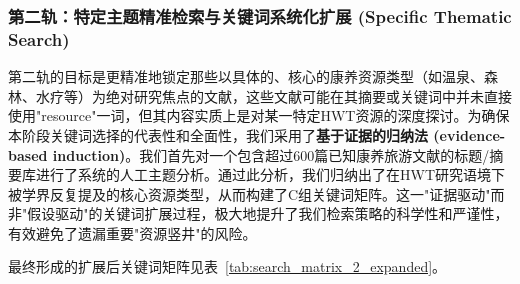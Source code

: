 \documentclass[UTF8, 12pt, a4paper, twoside]{ctexart}
\begin{document}
\subsubsection{第二轨：特定主题精准检索与关键词系统化扩展 (Specific Thematic Search)}
第二轨的目标是更精准地锁定那些以具体的、核心的康养资源类型（如温泉、森林、水疗等）为绝对研究焦点的文献，这些文献可能在其摘要或关键词中并未直接使用"resource"一词，但其内容实质上是对某一特定HWT资源的深度探讨。为确保本阶段关键词选择的代表性和全面性，我们采用了\textbf{基于证据的归纳法 (evidence-based induction)}。我们首先对一个包含超过600篇已知康养旅游文献的标题/摘要库进行了系统的人工主题分析。通过此分析，我们归纳出了在HWT研究语境下被学界反复提及的核心资源类型，从而构建了C组关键词矩阵。这一"证据驱动"而非"假设驱动"的关键词扩展过程，极大地提升了我们检索策略的科学性和严谨性，有效避免了遗漏重要"资源竖井"的风险。

最终形成的扩展后关键词矩阵见表~\ref{tab:search_matrix_2_expanded}。
\end{document}
